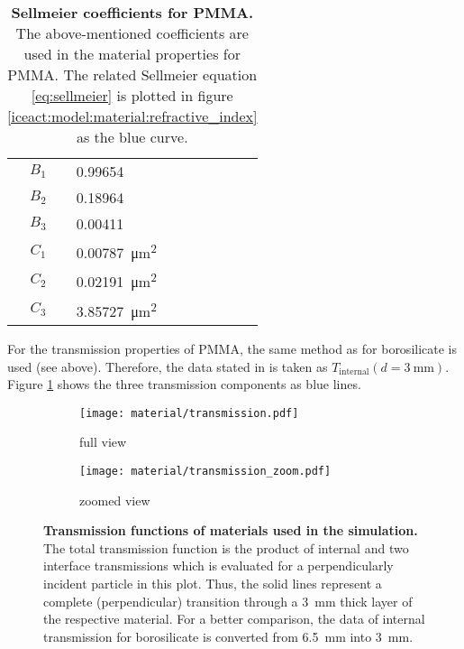 \begin{table}[h]
	\centering
	\begin{tabular}{c|l}
		$B_1$  & \num{0.99654}  \\
		$B_2$  & \num{0.18964}  \\
		$B_3$  & \num{0.00411}  \\
		$C_1$  & \SI{0.00787}{\micro\meter\squared}  \\
		$C_2$  & \SI{0.02191}{\micro\meter\squared}  \\
		$C_3$  & \SI{3.85727}{\micro\meter\squared}  \\
	\end{tabular}
	\caption[Sellmeier coefficients for PMMA]{\textbf{Sellmeier coefficients for PMMA.} \cite{iceact:refractiveindex} The above-mentioned coefficients are used in the \geant material properties for PMMA. The related Sellmeier equation \eqref{eq:sellmeier} is plotted in figure \ref{iceact:model:material:refractive_index} as the blue curve.}
	\label{iceact:model:pmma_sellmeiercoeffs}
\end{table}

For the transmission properties of PMMA, the same method as for borosilicate is used (see above). Therefore, the data stated in \cite{famous:niggemann} is taken as $T_\text{internal}(d = \SI{3}{\milli\meter})$. Figure \ref{iceact:model:material:transmission} shows the three transmission components as blue lines.

\begin{figure}[h]
	\centering
	\begin{subfigure}[t]{0.485\textwidth}
		\texttt{[image: material/transmission.pdf]}
		\caption{full view}
	\end{subfigure}
	\hfill
	\begin{subfigure}[t]{0.499\textwidth}
		\texttt{[image: material/transmission\_zoom.pdf]}
		\caption{zoomed view}
	\end{subfigure}
	\caption[Transmission of used materials]{\textbf{Transmission functions of materials used in the simulation.} The total transmission function is the product of internal and two interface transmissions which is evaluated for a perpendicularly incident particle in this plot. Thus, the solid lines represent a complete (perpendicular) transition through a \SI{3}{\milli\meter} thick layer of the respective material. For a better comparison, the data of internal transmission for borosilicate is converted from \SI{6.5}{\milli\meter} into \SI{3}{\milli\meter}.}
	\label{iceact:model:material:transmission}	
\end{figure}

